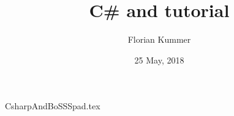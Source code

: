 \documentclass[10pt,a4paper]{article}
\title{C\# and \BoSSSpad{} tutorial}
\date{25 May, 2018}
\author{Florian Kummer}
\begin{document}
\maketitle

{CsharpAndBoSSSpad.tex}
\end{document}
